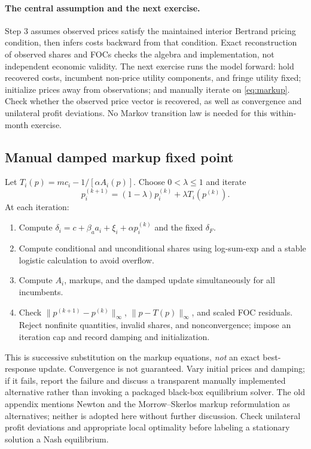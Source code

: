 \documentclass[11pt]{article}
\begin{document}
\paragraph{The central assumption and the next exercise.}
Step 3 assumes observed prices satisfy the maintained interior Bertrand pricing condition, then infers costs backward from that condition. Exact reconstruction of observed shares and FOCs checks the algebra and implementation, not independent economic validity. The next exercise runs the model forward: hold recovered costs, incumbent non-price utility components, and fringe utility fixed; initialize prices away from observations; and manually iterate on \eqref{eq:markup}. Check whether the observed price vector is recovered, as well as convergence and unilateral profit deviations. No Markov transition law is needed for this within-month exercise.

\subsection*{Manual damped markup fixed point}
Let $T_i(p)=mc_i-1/[\alpha A_i(p)]$. Choose $0<\lambda\leq1$ and iterate
\begin{equation}\label{eq:iterate}
p_i^{(k+1)}=(1-\lambda)p_i^{(k)}+\lambda T_i(p^{(k)}).
\end{equation}
At each iteration:
\begin{enumerate}
\item Compute $\delta_i=c+\beta_a a_i+\xi_i+\alpha p_i^{(k)}$ and the fixed $\delta_F$.
\item Compute conditional and unconditional shares using log-sum-exp and a stable logistic calculation to avoid overflow.
\item Compute $A_i$, markups, and the damped update simultaneously for all incumbents.
\item Check $\|p^{(k+1)}-p^{(k)}\|_\infty$, $\|p-T(p)\|_\infty$, and scaled FOC residuals. Reject nonfinite quantities, invalid shares, and nonconvergence; impose an iteration cap and record damping and initialization.
\end{enumerate}
This is successive substitution on the markup equations, \emph{not} an exact best-response update. Convergence is not guaranteed. Vary initial prices and damping; if it fails, report the failure and discuss a transparent manually implemented alternative rather than invoking a packaged black-box equilibrium solver. The old appendix mentions Newton and the Morrow--Skerlos markup reformulation as alternatives; neither is adopted here without further discussion. Check unilateral profit deviations and appropriate local optimality before labeling a stationary solution a Nash equilibrium.
\end{document}
